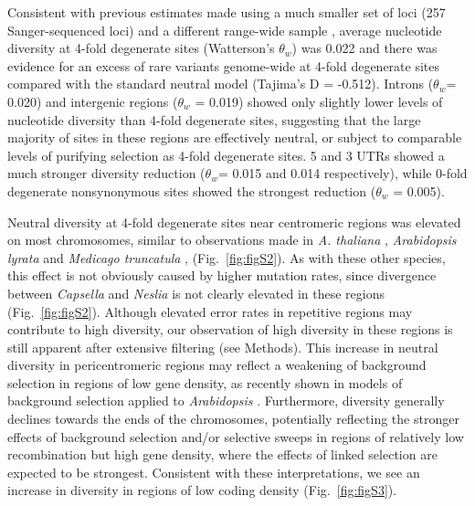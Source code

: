 Consistent with previous estimates made using a much smaller set of loci (257 Sanger-sequenced loci) and a different range-wide sample \citep{Slotte2010-gw}, average nucleotide diversity at 4-fold degenerate sites (Watterson’s $\theta_{w}$) was 0.022 and there was evidence for an excess of rare variants genome-wide at 4-fold degenerate sites compared with the standard neutral model (Tajima’s D = -0.512). Introns ($\theta_{w}$= 0.020) and intergenic regions ($\theta_{w}$ = 0.019) showed only slightly lower levels of nucleotide diversity than 4-fold degenerate sites, suggesting that the large majority of sites in these regions are effectively neutral, or subject to comparable levels of purifying selection as 4-fold degenerate sites. 5\textsc{} and 3\textsc{} UTRs showed a much stronger diversity reduction ($\theta_{w}$= 0.015 and 0.014 respectively), while 0-fold degenerate nonsynonymous sites showed the strongest reduction ($\theta_{w}$ = 0.005).

Neutral diversity at 4-fold degenerate sites near centromeric regions was elevated on most chromosomes, similar to observations made in \textit{A. thaliana} \citep{clark2007}, \textit{Arabidopsis lyrata} \citep{wright2006,kawabe2008} and \textit{Medicago truncatula} \citep{branca2011}, (Fig.~\ref{fig:figS2}). As with these other species, this effect is not obviously caused by higher mutation rates, since divergence between \textit{Capsella} and \textit{Neslia} is not clearly elevated in these regions (Fig.~\ref{fig:figS2}). Although elevated error rates in repetitive regions may contribute to high diversity, our observation of high diversity in these regions is still apparent after extensive filtering (see Methods). This increase in neutral diversity in pericentromeric regions may reflect a weakening of background selection in regions of low gene density, as recently shown in models of background selection applied to \textit{Arabidopsis} \citep{slotte2014impact}.  Furthermore, diversity generally declines towards the ends of the chromosomes, potentially reflecting the stronger effects of background selection and/or selective sweeps in regions of relatively low recombination but high gene density, where the effects of linked selection are expected to be strongest. Consistent with these interpretations, we see an increase in diversity in regions of low coding density (Fig.~\ref{fig:figS3}).


